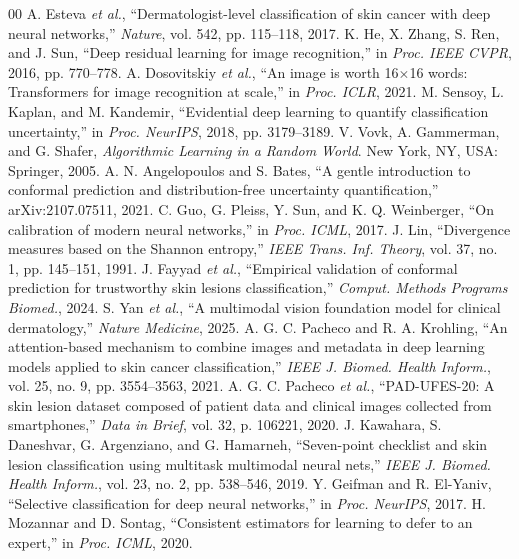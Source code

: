 \documentclass[conference]{IEEEtran}
\begin{document}
\begin{thebibliography}{00}
 A. Esteva \textit{et al.}, ``Dermatologist-level classification of skin cancer with deep neural networks,'' \textit{Nature}, vol. 542, pp. 115--118, 2017.
 K. He, X. Zhang, S. Ren, and J. Sun, ``Deep residual learning for image recognition,'' in \textit{Proc. IEEE CVPR}, 2016, pp. 770--778.
 A. Dosovitskiy \textit{et al.}, ``An image is worth 16$\times$16 words: Transformers for image recognition at scale,'' in \textit{Proc. ICLR}, 2021.
 M. Sensoy, L. Kaplan, and M. Kandemir, ``Evidential deep learning to quantify classification uncertainty,'' in \textit{Proc. NeurIPS}, 2018, pp. 3179--3189.
 V. Vovk, A. Gammerman, and G. Shafer, \textit{Algorithmic Learning in a Random World}. New York, NY, USA: Springer, 2005.
 A. N. Angelopoulos and S. Bates, ``A gentle introduction to conformal prediction and distribution-free uncertainty quantification,'' arXiv:2107.07511, 2021.
 C. Guo, G. Pleiss, Y. Sun, and K. Q. Weinberger, ``On calibration of modern neural networks,'' in \textit{Proc. ICML}, 2017.
 J. Lin, ``Divergence measures based on the Shannon entropy,'' \textit{IEEE Trans. Inf. Theory}, vol. 37, no. 1, pp. 145--151, 1991.
 J. Fayyad \textit{et al.}, ``Empirical validation of conformal prediction for trustworthy skin lesions classification,'' \textit{Comput. Methods Programs Biomed.}, 2024.
 S. Yan \textit{et al.}, ``A multimodal vision foundation model for clinical dermatology,'' \textit{Nature Medicine}, 2025.
 A. G. C. Pacheco and R. A. Krohling, ``An attention-based mechanism to combine images and metadata in deep learning models applied to skin cancer classification,'' \textit{IEEE J. Biomed. Health Inform.}, vol. 25, no. 9, pp. 3554--3563, 2021.
 A. G. C. Pacheco \textit{et al.}, ``PAD-UFES-20: A skin lesion dataset composed of patient data and clinical images collected from smartphones,'' \textit{Data in Brief}, vol. 32, p. 106221, 2020.
 J. Kawahara, S. Daneshvar, G. Argenziano, and G. Hamarneh, ``Seven-point checklist and skin lesion classification using multitask multimodal neural nets,'' \textit{IEEE J. Biomed. Health Inform.}, vol. 23, no. 2, pp. 538--546, 2019.
 Y. Geifman and R. El-Yaniv, ``Selective classification for deep neural networks,'' in \textit{Proc. NeurIPS}, 2017.
 H. Mozannar and D. Sontag, ``Consistent estimators for learning to defer to an expert,'' in \textit{Proc. ICML}, 2020.

\end{thebibliography}
\end{document}
